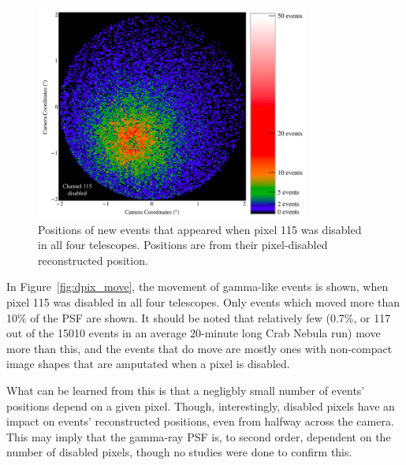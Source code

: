    \begin{figure}[!ht]
      \centering
      \includegraphics[width=0.8\textwidth]{images/disabled_pixel/appearing_events}
      \caption[New Events that Appear when Disabling Camera Pixels]{
        Positions of new events that appeared when pixel 115 was disabled in all four telescopes.
        Positions are from their pixel-disabled reconstructed position.
      }
      \label{fig:dpix_appear}
    \end{figure}

    In Figure~\ref{fig:dpix_move}, the movement of gamma-like events is shown, when pixel 115 was disabled in all four telescopes.
    Only events which moved more than 10\% of the PSF are shown.
    It should be noted that relatively few (0.7\%, or 117 out of the 15010 events in an average 20-minute long Crab Nebula run) move more than this, and the events that do move are mostly ones with non-compact image shapes that are amputated when a pixel is disabled.

    What can be learned from this is that a negligbly small number of events' positions depend on a given pixel.
    Though, interestingly, disabled pixels have an impact on events' reconstructed positions, even from halfway across the camera.
    This may imply that the gamma-ray PSF is, to second order, dependent on the number of disabled pixels, though no studies were done to confirm this.

